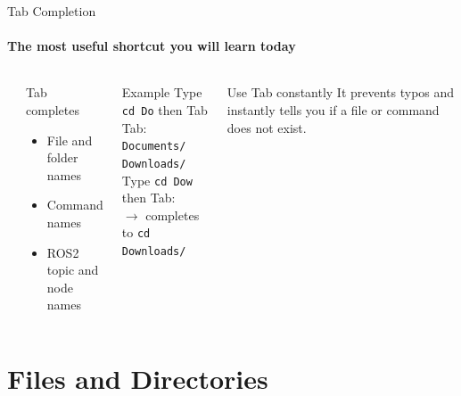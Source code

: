 \documentclass[aspectratio=169]{beamer}
\begin{document}
\begin{frame}{Tab Completion}
  \framesubtitle{The most useful shortcut you will learn today}
  \begin{columns}
      \begin{center}
      \end{center}
      \begin{exampleblock}{Tab completes}
        \begin{itemize}
          \item File and folder names
          \item Command names
          \item ROS2 topic and node names
        \end{itemize}
      \end{exampleblock}
      \begin{block}{Example}
        Type \texttt{cd Do} then Tab Tab:\\[0.2em]
        \texttt{Documents/} \quad \texttt{Downloads/}\\[0.3em]
        Type \texttt{cd Dow} then Tab:\\[0.2em]
        $\rightarrow$ completes to \texttt{cd Downloads/}
      \end{block}
      \begin{alertblock}{Use Tab constantly}
    It prevents typos and instantly tells you if a file or command does not exist.
  \end{alertblock}
  \end{columns}
  
\end{frame}

\section{Files and Directories}
\end{document}
